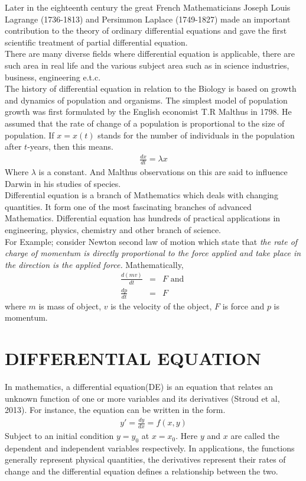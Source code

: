 \documentclass[11pt]{report}
\newcommand{\sps}{\\[0.2cm]}
\newcommand{\NI}{\noindent}
\newcommand{\sprime}{'}
\begin{document}
	\NI Later in the eighteenth century the great French Mathematicians Joseph Louis Lagrange (1736-1813) and Persimmon Laplace (1749-1827) made an important contribution to the theory of ordinary differential equations and gave the first scientific treatment of partial differential equation.\\
	
	\NI There are many diverse fields where differential equation is applicable, there are such area in real life and the various subject area such as in science industries, business, engineering  e.t.c.\\
	
	\NI The history of differential equation in relation to the Biology is based on growth and dynamics of population and organisms. The simplest model of population growth was first formulated by the English economist T.R Malthus in 1798. He assumed that the rate of change of a population is proportional to the size of population. If $x =x(t)$ stands for the number of individuals in the population after $t$-years, then this means.
	\begin{eqnarray}
		\frac{dx}{dt} = \lambda x \label{eq:1_4}
	\end{eqnarray}
	Where $\lambda$ is a constant. And Malthus observations on this are said to influence Darwin in his studies of species.\\
		
	\NI Differential equation is a branch of Mathematics which deals with changing quantities. It form one of the most fascinating branches of advanced Mathematics. Differential equation has hundreds of practical applications in engineering, physics, chemistry and other branch of science.\\
	
	\NI For Example; consider Newton second law of motion which state that \textit{the rate of charge of momentum is directly proportional to the force applied and take place in the direction is the applied force.} Mathematically, 
	\begin{eqnarray*}
		\frac{d(mv)}{dt} &=& F \text{ and }\sps
		\frac{dp}{dt} &=& F
	\end{eqnarray*}
	where $m$ is mass of object, $v$ is the velocity of the object, $F$ is force  and $p$ is momentum.
	
	\section{DIFFERENTIAL EQUATION}
	In mathematics, a differential equation(DE) is an equation that relates an unknown function of one or more variables and its derivatives (Stroud et al, 2013). For instance, the equation can be written in the form. 
	\begin{eqnarray}
		y\sprime = \frac{dy}{dx} = f(x,y)\label{eq:2_1}
	\end{eqnarray}
	Subject to an initial condition $y=y_0$ at $x=x_0$. Here $y$ and $x$ are called the dependent  and independent variables respectively. In applications, the functions generally represent physical quantities, the derivatives represent their rates of change and the differential equation defines a relationship between the two.
	
\end{document}
